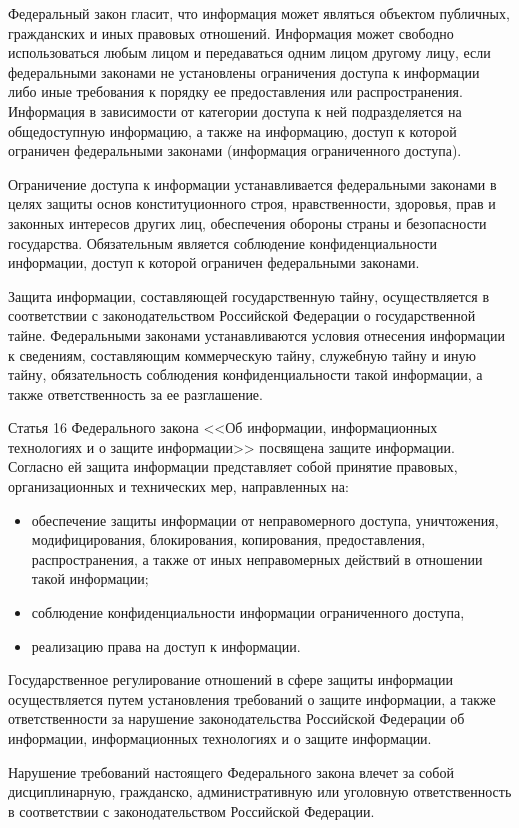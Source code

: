 Федеральный закон гласит, что информация может являться объектом публичных, гражданских и иных правовых отношений. Информация может свободно использоваться любым лицом и передаваться одним лицом другому лицу, если федеральными законами не установлены ограничения доступа к информации либо иные требования к порядку ее предоставления или распространения. Информация в зависимости от категории доступа к ней подразделяется на общедоступную информацию, а также на информацию, доступ к которой ограничен федеральными законами (информация ограниченного доступа).

\vspace{\baselineskip}
Ограничение доступа к информации устанавливается федеральными законами в целях защиты основ конституционного строя, нравственности, здоровья, прав и законных интересов других лиц, обеспечения обороны страны и безопасности государства. Обязательным является соблюдение конфиденциальности информации, доступ к которой ограничен федеральными законами.

\vspace{\baselineskip}
Защита информации, составляющей государственную тайну, осуществляется в соответствии с законодательством Российской Федерации о государственной тайне. Федеральными законами устанавливаются условия отнесения информации к сведениям, составляющим коммерческую тайну, служебную тайну и иную тайну, обязательность соблюдения конфиденциальности такой информации, а также ответственность за ее разглашение.

\vspace{\baselineskip}
Статья 16 Федерального закона <<Об информации, информационных технологиях и о защите информации>> посвящена защите информации. Согласно ей защита информации представляет собой принятие правовых, организационных и технических мер, направленных на:
\begin{itemize}
	\item обеспечение защиты информации от неправомерного доступа, уничтожения, модифицирования, блокирования, копирования, предоставления, распространения, а также от иных неправомерных действий в отношении такой информации;
	\item соблюдение конфиденциальности информации ограниченного доступа,
	\item реализацию права на доступ к информации.
\end{itemize}

Государственное регулирование отношений в сфере защиты информации осуществляется путем установления требований о защите информации, а также ответственности за нарушение законодательства Российской Федерации об информации, информационных технологиях и о защите информации. 

\vspace{\baselineskip}
Нарушение требований настоящего Федерального закона влечет за собой дисциплинарную, гражданско, административную или уголовную ответственность в соответствии с законодательством Российской Федерации.
